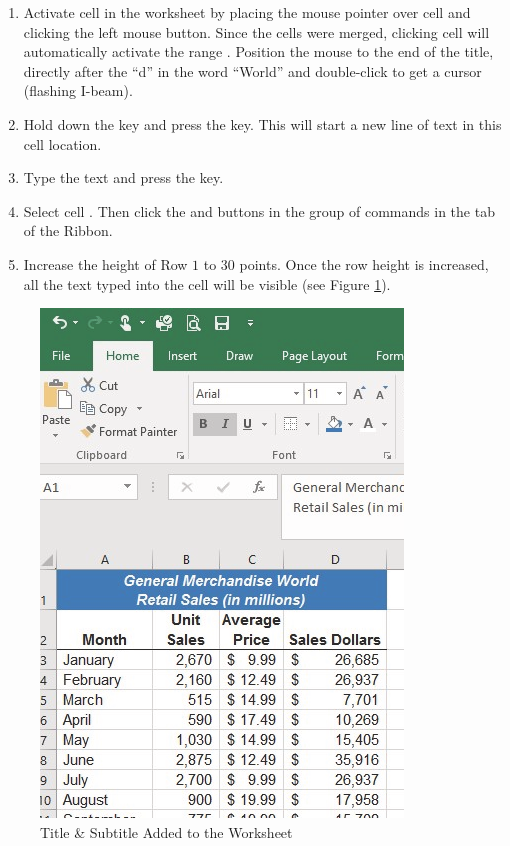 \begin{enumerate}
	\item Activate cell  in the  worksheet by placing the mouse pointer over cell  and clicking the left mouse button. Since the cells were merged, clicking cell  will automatically activate the range . Position the mouse to the end of the title, directly after the ``d'' in the word ``World'' and double-click to get a cursor (flashing I-beam).
	\item Hold down the  key and press the  key. This will start a new line of text in this cell location.
	\item Type the text  and press the  key.
	\item Select cell . Then click the  and  buttons in the  group of commands in the  tab of the Ribbon.
	\item Increase the height of Row $ 1 $ to $ 30 $ points. Once the row height is increased, all the text typed into the cell will be visible (see Figure \ref{01:fig41}).

\end{enumerate}

\begin{figure}[H]
	\centering
	\includegraphics[width=\maxwidth{.95\linewidth}]{gfx/ch01_fig41}
	\caption{Title \& Subtitle Added to the Worksheet}
	\label{01:fig41}
\end{figure}

